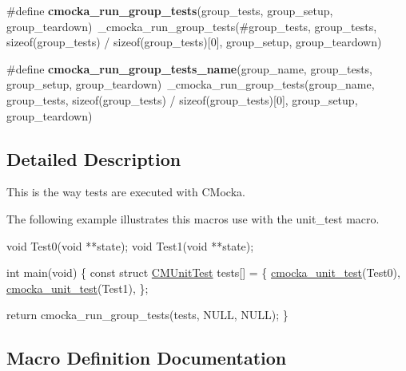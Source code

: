 \begin{DoxyCompactItemize}
\item 
\mbox{\label{group__cmocka__exec_ga85cfe301d4c23b9180d36c629895a4b9}} 
\#define {\bfseries cmocka\+\_\+run\+\_\+group\+\_\+tests}(group\+\_\+tests,  group\+\_\+setup,  group\+\_\+teardown)~\+\_\+cmocka\+\_\+run\+\_\+group\+\_\+tests(\#group\+\_\+tests, group\+\_\+tests, sizeof(group\+\_\+tests) / sizeof(group\+\_\+tests)\mbox{[}0\mbox{]}, group\+\_\+setup, group\+\_\+teardown)
\item 
\mbox{\label{group__cmocka__exec_ga6ee568a92286ba90e697f6fdc246e3b4}} 
\#define {\bfseries cmocka\+\_\+run\+\_\+group\+\_\+tests\+\_\+name}(group\+\_\+name,  group\+\_\+tests,  group\+\_\+setup,  group\+\_\+teardown)~\+\_\+cmocka\+\_\+run\+\_\+group\+\_\+tests(group\+\_\+name, group\+\_\+tests, sizeof(group\+\_\+tests) / sizeof(group\+\_\+tests)\mbox{[}0\mbox{]}, group\+\_\+setup, group\+\_\+teardown)
\end{DoxyCompactItemize}


\subsection{Detailed Description}
This is the way tests are executed with C\+Mocka.

The following example illustrates this macro\textquotesingle{}s use with the unit\+\_\+test macro.


\begin{DoxyCode}
\textcolor{keywordtype}{void} Test0(\textcolor{keywordtype}{void} **state);
\textcolor{keywordtype}{void} Test1(\textcolor{keywordtype}{void} **state);

\textcolor{keywordtype}{int} main(\textcolor{keywordtype}{void})
\{
    \textcolor{keyword}{const} \textcolor{keyword}{struct }\hyperlink{structCMUnitTest}{CMUnitTest} tests[] = \{
        \hyperlink{group__cmocka__exec_ga562719c550b5ce277aab6b0371f7f34f}{cmocka\_unit\_test}(Test0),
        \hyperlink{group__cmocka__exec_ga562719c550b5ce277aab6b0371f7f34f}{cmocka\_unit\_test}(Test1),
    \};

    \textcolor{keywordflow}{return} cmocka\_run\_group\_tests(tests, NULL, NULL);
\}
\end{DoxyCode}
 

\subsection{Macro Definition Documentation}
\mbox{\label{group__cmocka__exec_ga562719c550b5ce277aab6b0371f7f34f}} 
